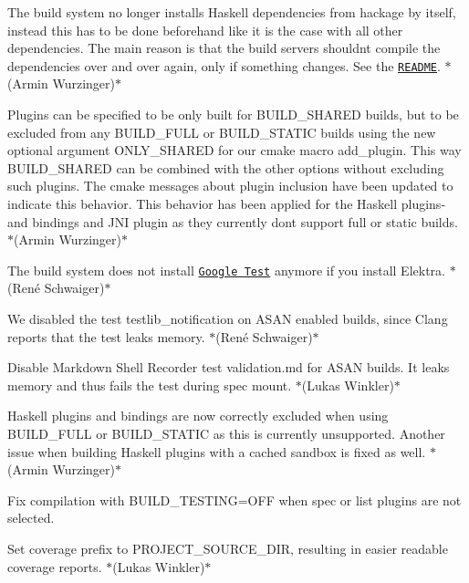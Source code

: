 \begin{DoxyItemize}
\item The build system no longer installs Haskell dependencies from hackage by itself, instead this has to be done beforehand like it is the case with all other dependencies. The main reason is that the build servers shouldn\textquotesingle{}t compile the dependencies over and over again, only if something changes. See the \href{https://www.libelektra.org/bindings/haskell}{\tt R\+E\+A\+D\+ME}. $\ast$(Armin Wurzinger)$\ast$
\item Plugins can be specified to be only built for {\ttfamily B\+U\+I\+L\+D\+\_\+\+S\+H\+A\+R\+ED} builds, but to be excluded from any {\ttfamily B\+U\+I\+L\+D\+\_\+\+F\+U\+LL} or {\ttfamily B\+U\+I\+L\+D\+\_\+\+S\+T\+A\+T\+IC} builds using the new optional argument {\ttfamily O\+N\+L\+Y\+\_\+\+S\+H\+A\+R\+ED} for our cmake macro {\ttfamily add\+\_\+plugin}. This way {\ttfamily B\+U\+I\+L\+D\+\_\+\+S\+H\+A\+R\+ED} can be combined with the other options without excluding such plugins. The cmake messages about plugin inclusion have been updated to indicate this behavior. This behavior has been applied for the Haskell plugins-\/ and bindings and J\+NI plugin as they currently don\textquotesingle{}t support full or static builds. $\ast$(Armin Wurzinger)$\ast$
\item The build system does not install \href{https://github.com/google/googletest}{\tt Google Test} anymore if you install Elektra. $\ast$(René Schwaiger)$\ast$
\item We disabled the test {\ttfamily testlib\+\_\+notification} on A\+S\+AN enabled builds, since Clang reports that the test leaks memory. $\ast$(René Schwaiger)$\ast$
\item Disable Markdown Shell Recorder test {\ttfamily validation.\+md} for A\+S\+AN builds. It leaks memory and thus fails the test during spec mount. $\ast$(Lukas Winkler)$\ast$
\item Haskell plugins and bindings are now correctly excluded when using {\ttfamily B\+U\+I\+L\+D\+\_\+\+F\+U\+LL} or {\ttfamily B\+U\+I\+L\+D\+\_\+\+S\+T\+A\+T\+IC} as this is currently unsupported. Another issue when building Haskell plugins with a cached sandbox is fixed as well. $\ast$(Armin Wurzinger)$\ast$
\item Fix compilation with {\ttfamily B\+U\+I\+L\+D\+\_\+\+T\+E\+S\+T\+I\+NG=O\+FF} when {\ttfamily spec} or {\ttfamily list} plugins are not selected.
\item Set coverage prefix to {\ttfamily P\+R\+O\+J\+E\+C\+T\+\_\+\+S\+O\+U\+R\+C\+E\+\_\+\+D\+IR}, resulting in easier readable coverage reports. $\ast$(Lukas Winkler)$\ast$

\end{DoxyItemize}
